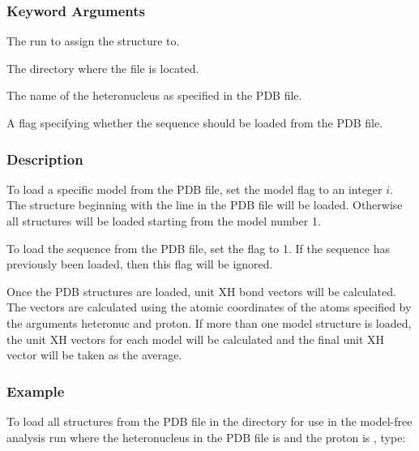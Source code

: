 \subsubsection{Keyword Arguments}

  The run to assign the structure to.

  The directory where the file is located.

  The name of the heteronucleus as specified in the PDB file.

  A flag specifying whether the sequence should be loaded from the PDB file.

\subsubsection{Description}

To load a specific model from the PDB file, set the model flag to an integer $i$.  The
structure beginning with the line 
 in the PDB file will be loaded.  Otherwise all
structures will be loaded starting from the model number 1.

To load the sequence from the PDB file, set the 
 flag to 1.  If the sequence has
previously been loaded, then this flag will be ignored.

Once the PDB structures are loaded, unit XH bond vectors will be calculated.  The vectors
are calculated using the atomic coordinates of the atoms specified by the arguments
heteronuc and proton.  If more than one model structure is loaded, the unit XH vectors for
each model will be calculated and the final unit XH vector will be taken as the average.


\subsubsection{Example}

To load all structures from the PDB file 
 in the directory 
 for use in the
model-free analysis run 
 where the heteronucleus in the PDB file is 
 and the proton
is 
, type:





